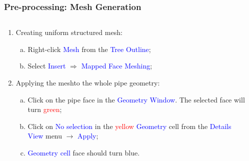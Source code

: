 \documentclass[10pt,compress, unknownkeysallowed]{beamer}
\newcommand{\red}{\textcolor{red}}
\newcommand{\blue}{\textcolor{blue}}
\begin{document}
 
\begin{frame}
 \frametitle{Pre-processing: Mesh Generation} 
    \begin{columns}
       \begin{column}[l]{0.5\linewidth}
          \begin{enumerate}\scriptsize\setcounter{enumi}{3}
             \item<1-> Creating uniform structured mesh:
                \begin{enumerate}[a)]\scriptsize
                   \item<2-> Right-click \blue{Mesh} from the \blue{Tree Outline};
                   \item<2-> Select \blue{Insert} $\Rightarrow$ \blue{Mapped Face Meshing};
                \end{enumerate}
             \item<3-> Applying the meshto the whole pipe geometry:
                \begin{enumerate}[a)]\scriptsize
                   \item<3-> Click on the pipe face in the \blue{Geometry Window}. The selected face will turn \red{green};
                   \item<3-> Click on \blue{No selection} in the \red{yellow} \blue{Geometry} cell from the \blue{Details View} menu $\rightarrow$ \blue{Apply};
                   \item<3-> \blue{Geometry cell} face should turn blue.
                \end{enumerate}
          \end{enumerate}
       \end{column}
       \begin{column}[l]{0.5\linewidth}
       \end{column}
    \end{columns}
\end{frame} 
\end{document}
